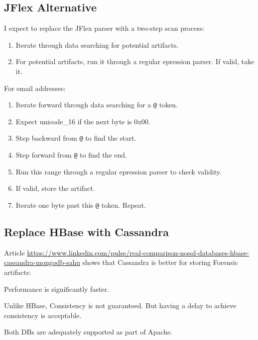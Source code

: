\documentclass[12pt,twoside]{article}
\begin{document}
\subsection{JFlex Alternative}
I expect to replace the JFlex parser with a two-step scan process:
\begin{enumerate}
\item Iterate through data searching for potential artifacts.
\item For potential artifacts, run it through a regular epression parser. If valid, take it.
\end{enumerate}
For email addresses:
\begin{enumerate}
\item Iterate forward through data searching for a \verb+@+ token.
\item Expect unicode\_16 if the next byte is 0x00.
\item Step backward from \verb+@+ to find the start.
\item Step forward from \verb+@+ to find the end.
\item Run this range through a regular epression parser to check validity.
\item If valid, store the artifact.
\item Iterate one byte past this \verb+@+ token.  Repeat.
\end{enumerate}

\subsection{Replace HBase with Cassandra}
Article \url{https://www.linkedin.com/pulse/real-comparison-nosql-databases-hbase-cassandra-mongodb-sahu} shows that Cassandra is better for storing Forensic artifacts:
\begin{compactitem}
\item Performance is significantly faster.
\item Unlike HBase, Consistency is not guaranteed. But having a delay to achieve consistency is acceptable.
\item Both DBs are adequately supported as part of Apache.
\end{compactitem}
\end{document}
